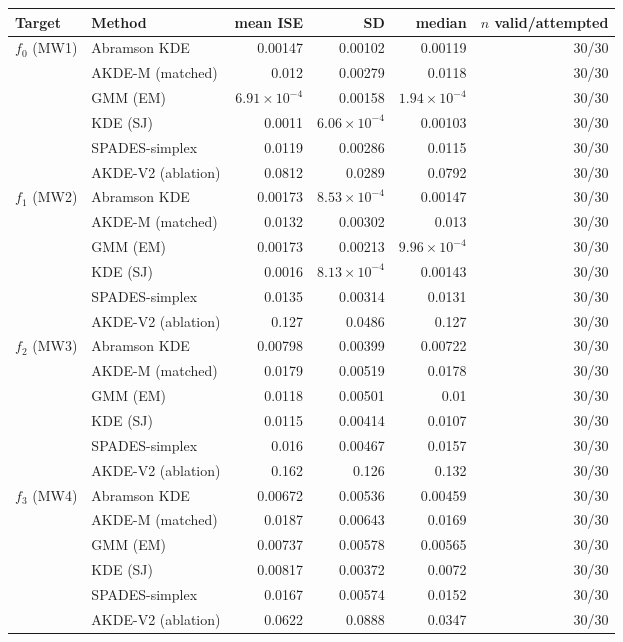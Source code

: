 \begin{tabular}{llrrrr}
\toprule
Target & Method & mean ISE & SD & median & $n$ valid/attempted \\
\midrule
$f_{0}$ (MW1) & Abramson KDE & 0.00147 & 0.00102 & 0.00119 & 30/30 \\
 & AKDE-M (matched) & 0.012 & 0.00279 & 0.0118 & 30/30 \\
 & GMM (EM) & $6.91\times10^{-4}$ & 0.00158 & $1.94\times10^{-4}$ & 30/30 \\
 & KDE (SJ) & 0.0011 & $6.06\times10^{-4}$ & 0.00103 & 30/30 \\
 & SPADES-simplex & 0.0119 & 0.00286 & 0.0115 & 30/30 \\
 & AKDE-V2 (ablation) & 0.0812 & 0.0289 & 0.0792 & 30/30 \\
$f_{1}$ (MW2) & Abramson KDE & 0.00173 & $8.53\times10^{-4}$ & 0.00147 & 30/30 \\
 & AKDE-M (matched) & 0.0132 & 0.00302 & 0.013 & 30/30 \\
 & GMM (EM) & 0.00173 & 0.00213 & $9.96\times10^{-4}$ & 30/30 \\
 & KDE (SJ) & 0.0016 & $8.13\times10^{-4}$ & 0.00143 & 30/30 \\
 & SPADES-simplex & 0.0135 & 0.00314 & 0.0131 & 30/30 \\
 & AKDE-V2 (ablation) & 0.127 & 0.0486 & 0.127 & 30/30 \\
$f_{2}$ (MW3) & Abramson KDE & 0.00798 & 0.00399 & 0.00722 & 30/30 \\
 & AKDE-M (matched) & 0.0179 & 0.00519 & 0.0178 & 30/30 \\
 & GMM (EM) & 0.0118 & 0.00501 & 0.01 & 30/30 \\
 & KDE (SJ) & 0.0115 & 0.00414 & 0.0107 & 30/30 \\
 & SPADES-simplex & 0.016 & 0.00467 & 0.0157 & 30/30 \\
 & AKDE-V2 (ablation) & 0.162 & 0.126 & 0.132 & 30/30 \\
$f_{3}$ (MW4) & Abramson KDE & 0.00672 & 0.00536 & 0.00459 & 30/30 \\
 & AKDE-M (matched) & 0.0187 & 0.00643 & 0.0169 & 30/30 \\
 & GMM (EM) & 0.00737 & 0.00578 & 0.00565 & 30/30 \\
 & KDE (SJ) & 0.00817 & 0.00372 & 0.0072 & 30/30 \\
 & SPADES-simplex & 0.0167 & 0.00574 & 0.0152 & 30/30 \\
 & AKDE-V2 (ablation) & 0.0622 & 0.0888 & 0.0347 & 30/30 \\

\end{tabular}
